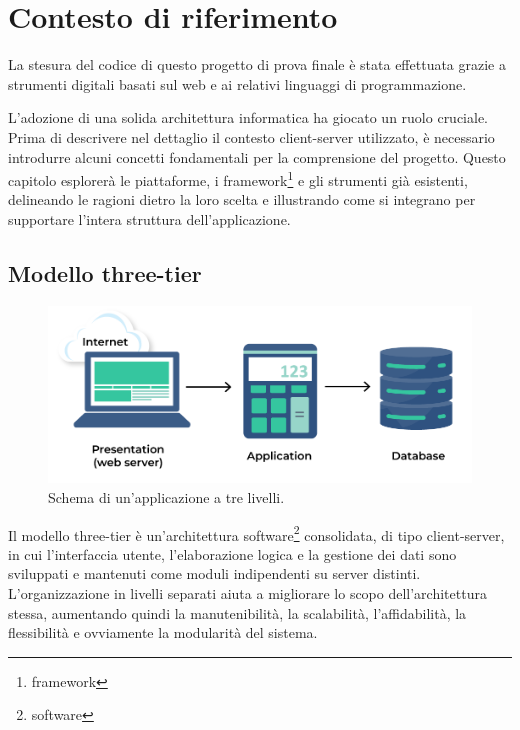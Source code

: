 \setlength{\headheight}{14.49998pt}
\addtolength{\topmargin}{-2.49998pt}
\chapter{Contesto di riferimento}\label{ch:Contesto}
La stesura del codice di questo progetto di prova finale è stata effettuata grazie a strumenti digitali basati sul web e ai relativi linguaggi di programmazione. 

L'adozione di una solida architettura informatica ha giocato un ruolo cruciale. 
Prima di descrivere nel dettaglio il contesto client-server utilizzato, è necessario introdurre alcuni concetti fondamentali per la comprensione del progetto.
Questo capitolo esplorerà le piattaforme, i \gls{framework}\footnote{\glsdesc{framework}} e gli strumenti già esistenti, delineando le ragioni dietro la loro scelta e illustrando come si integrano per supportare l'intera struttura dell'applicazione.

\section{Modello three-tier}\label{sec:3-tier}
\begin{figure}[H]
\centering
\includegraphics[width=1\textwidth]{Images/3-Tier-architecture.png}
\caption{\label{fig:3-tier}Schema di un'applicazione a tre livelli.}
\end{figure}

Il modello three-tier è un'architettura software\footnote{\glsdesc{software}} consolidata, di tipo client-server, in cui l'interfaccia utente, l'elaborazione logica e la gestione dei dati sono sviluppati e mantenuti come moduli indipendenti su server distinti. L'organizzazione in livelli separati aiuta a migliorare lo scopo dell'architettura stessa, aumentando quindi la manutenibilità, la scalabilità, l'affidabilità, la flessibilità e ovviamente la modularità del sistema.

